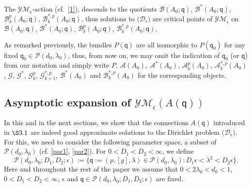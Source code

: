 \documentclass[11pt]{article}
\numberwithin{equation}{section} \setlength{\topmargin}{-35pt}
\newcommand{\PP}{\mathcal{P}}
\newcommand{\YMe}{\mathcal{YM}_{\epsilon}}
\newcommand{\q}{\mathsf{q}}
\begin{document}

\noindent The $\mathcal{YM}_{\epsilon}$-action (cf.~\eqref{1}),
 descends to the quotients $\mathcal{B}(A_0;\q)$,
$\mathcal{B}^{\ast}(A_0;\q)$, $\mathcal{B}^p_{k}(A_0;\q)$,
$\mathcal{B}^{\ast,p}_k(A_0;\q)$, thus solutions to
$\bigl(\mathcal{D}_{\epsilon}\bigr)$ are critical points of
$\mathcal{YM}_{\epsilon}$ on $\mathcal{B}(A_0;\q)$,
$\mathcal{B}^{\ast}(A_0;\q)$, $\mathcal{B}^p_{k}(A_0;\q)$,
$\mathcal{B}^{\ast,p}_k(A_0;\q)$.

As remarked previously, the bundles $P(\q)$ are all isomorphic to
$P({\q}_0)$ for any fixed ${\q}_0\in\PP(d_0,\lambda_0)$, thus, from
now on, we may omit the indication of ${\q}_0$ (or $\q$) from our
notation and simply write $P$, $\mathcal{A}(A_0)$,
$\mathcal{A}^{\ast}(A_0)$, $\mathcal{A}^p_k(A_0)$,
$\mathcal{A}^{\ast,p}_k(A_0)$, $\mathcal{G}$, $\mathcal{G}^{\ast}$,
$\mathcal{G}^p_{k}$, $\mathcal{G}^{\ast,p}_{k+1}$,
$\mathcal{B}^{\ast}(A_0)$ and $\mathcal{B}^{\ast,p}_k(A_0)$ for the
corresponding objects.



\subsection{Asymptotic expansion of $\YMe(A(\q))$}
In this and in the next sections, we show that the connections
$A(\q)$ introduced in $\S3.1$ are indeed good approximate solutions
to the Dirichlet problem $\bigl(\mathcal{D}_{\epsilon}\bigr)$. For
this, we need to consider the following parameter space, a subset of
$ \PP(d_0,\lambda_0)$ (cf. \eqref{par1}, \eqref{par2}). For
$0<D_1<D_2<\infty$, we define
\begin{equation}
\label{3.2}
 \PP(d_0,\lambda_0;D_1,D_2;\epsilon):=\{\q:=(p,[g],\lambda)\in \PP(d_0,\lambda_0):D_1\epsilon<\lambda^2<D_2\epsilon\}.
\end{equation}
Here and throughout the rest of the paper we assume that
$0<2\lambda_0<d_0<1$, $0<D_1<D_2<\infty$, $\epsilon$ and
$\q\in\PP(d_0,\lambda_0;D_1,D_2;\epsilon)$ are fixed.
\end{document}
